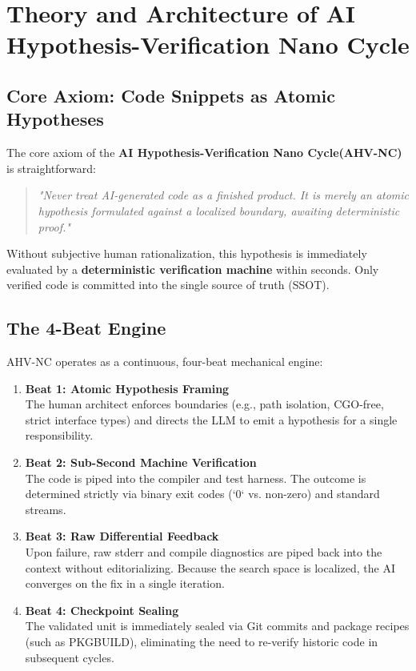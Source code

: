 \documentclass[11pt,a4paper,openany]{book}
\begin{document}
  \chapter{Theory and Architecture of AI Hypothesis-Verification Nano Cycle\texttrademark}
  \section{Core Axiom: Code Snippets as Atomic Hypotheses}
  The core axiom of the \textbf{AI Hypothesis-Verification Nano Cycle\texttrademark (AHV-NC)} is straightforward:

  \begin{quote}
  \textit{"Never treat AI-generated code as a finished product. It is merely an atomic hypothesis formulated against a localized boundary, awaiting deterministic proof."}
  \end{quote}

  Without subjective human rationalization, this hypothesis is immediately evaluated by a \textbf{deterministic verification machine} within seconds. Only verified code is committed into the single source of truth (SSOT).

  \section{The 4-Beat Engine}
  AHV-NC operates as a continuous, four-beat mechanical engine:

  \begin{enumerate}
    \item \textbf{Beat 1: Atomic Hypothesis Framing}\\
      The human architect enforces boundaries (e.g., path isolation, CGO-free, strict interface types) and directs the LLM to emit a hypothesis for a single responsibility.
    \item \textbf{Beat 2: Sub-Second Machine Verification}\\
      The code is piped into the compiler and test harness. The outcome is determined strictly via binary exit codes (`0` vs. non-zero) and standard streams.
    \item \textbf{Beat 3: Raw Differential Feedback}\\
      Upon failure, raw stderr and compile diagnostics are piped back into the context without editorializing. Because the search space is localized, the AI converges on the fix in a single iteration.
    \item \textbf{Beat 4: Checkpoint Sealing}\\
      The validated unit is immediately sealed via Git commits and package recipes (such as PKGBUILD), eliminating the need to re-verify historic code in subsequent cycles.
  \end{enumerate}
\fi
\end{document}
